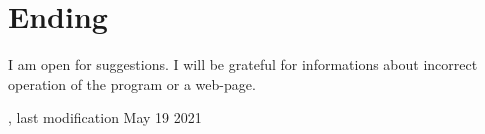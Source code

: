 \documentclass[polish,a4paper,11pt,oneside]{article}
\begin{document}

\section{Ending}

I am open for suggestions. I will be grateful for informations about incorrect operation of the program or a web-page.

{\setlength{\parindent}{0pt}\small{}
, last modification May 19 2021}
\end{document}
